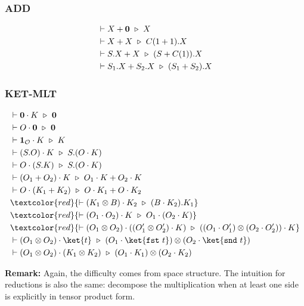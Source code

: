 \subsubsection*{\textsf{ADD}}
\begin{align*}
  & \vdash X + \mathbf{0} \ \triangleright\  X \\
  & \vdash X + X \ \triangleright\  C(1 + 1).X \\
  & \vdash S.X + X \ \triangleright\  (S + C(1)).X \\
  & \vdash S_1.X + S_2.X \ \triangleright\  (S_1 + S_2).X
\end{align*}

\subsubsection*{\textsf{KET-MLT}}
\begin{align*}
  & \vdash \textbf{0} \cdot K \reduce \textbf{0} \\
  & \vdash O \cdot \mathbf{0} \reduce \mathbf{0} \\
  & \vdash \textbf{1}_\mathcal{O} \cdot K \reduce K \\
  & \vdash (S.O) \cdot K \reduce S.(O \cdot K) \\
  & \vdash O \cdot (S.K) \reduce S.(O \cdot K) \\
  & \vdash (O_1 + O_2) \cdot K \reduce O_1 \cdot K + O_2 \cdot K \\
  & \vdash O \cdot (K_1 + K_2) \reduce O \cdot K_1 + O \cdot K_2 \\
  & \textcolor{red}{\vdash (K_1 \otimes B) \cdot K_2 \reduce (B \cdot K_2).K_1} \\
  & \textcolor{red}{\vdash (O_1 \cdot O_2) \cdot K \reduce O_1 \cdot (O_2 \cdot K)} \\
  & \textcolor{red}{\vdash (O_1 \otimes O_2) \cdot ((O_1' \otimes O_2') \cdot K) \reduce ((O_1 \cdot O_1') \otimes (O_2 \cdot O_2')) \cdot K} \\
  & \vdash (O_1 \otimes O_2) \cdot \ket{t} \reduce (O_1 \cdot \ket{\fst\ t}) \otimes (O_2 \cdot \ket{\snd\ t}) \\
  & \vdash (O_1 \otimes O_2) \cdot (K_1 \otimes K_2) \reduce (O_1 \cdot K_1) \otimes (O_2 \cdot K_2)
\end{align*}

\textbf{Remark: } Again, the difficulty comes from space structure. The intuition for reductions is also the same: decompose the multiplication when at least one side is explicitly in tensor product form.


